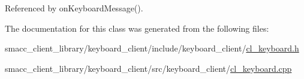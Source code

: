Referenced by on\+Keyboard\+Message().



The documentation for this class was generated from the following files\+:\begin{DoxyCompactItemize}
\item 
smacc\+\_\+client\+\_\+library/keyboard\+\_\+client/include/keyboard\+\_\+client/\hyperlink{cl__keyboard_8h}{cl\+\_\+keyboard.\+h}\item 
smacc\+\_\+client\+\_\+library/keyboard\+\_\+client/src/keyboard\+\_\+client/\hyperlink{cl__keyboard_8cpp}{cl\+\_\+keyboard.\+cpp}\end{DoxyCompactItemize}
